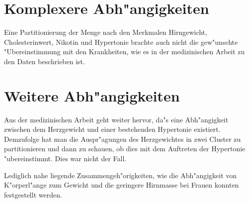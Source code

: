 \section{Komplexere Abh"angigkeiten}
Eine Partitionierung der Menge nach den Merkmalen Hirngewicht, 
Cholesterinwert, Nikotin und Hypertonie brachte auch nicht die
gew"unschte "Ubereinstimmung mit den Krankheiten, wie es in der 
medizinischen Arbeit zu den Daten beschrieben ist.

\section{Weitere Abh"angigkeiten}
Aus der medizinischen Arbeit geht weiter hervor, da"s eine Abh"angigkeit
zwischen dem Herzgewicht und einer bestehenden Hypertonie existiert.
Demzufolge hat man die Auspr"agungen des Herzgewichtes in zwei Cluster
zu partitionieren und dann zu schauen, ob dies mit dem Auftreten der
Hypertonie "ubereinstimmt. Dies war nicht der Fall.

Lediglich nahe liegende Zusammengeh"origkeiten, wie die Abh"angigkeit
von K"or\-per\-l"an\-ge zum Gewicht und die geringere Hirnmasse bei Frauen
konnten festgestellt werden.
